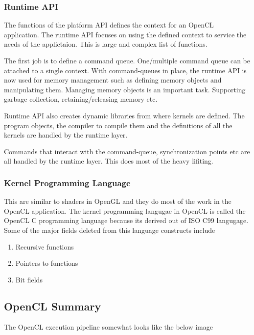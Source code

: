 \subsubsection{Runtime API}
The functions of the platform API defines the context for an OpenCL application. The runtime API focuses on using the defined context to service the needs of the applictaion. This is large and complex list of functions.

The first job is to define a command queue. One/multiple command queue can be attached to a single context. With command-queues in place, the runtime API is now used for memory management such as defining memory objects and manipulating them. Managing memory objects is an important task. Supporting garbage collection, retaining/releasing memory etc.

Runtime API also creates dynamic libraries from where kernels are defined. The program objects, the compiler to compile them and the definitions of all the kernels are handled by the runtime layer.

Commands that interact with the command-queue, synchronization points etc are all handled by the runtime layer. This does most of the heavy lifiting.

\subsubsection{Kernel Programming Language}
This are similar to shaders in OpenGL and they do most of the work in the OpenCL application. The kernel programming langugae in OpenCL is called the OpenCL C programming language because its derived out of ISO C99 langugage. Some of the major fields deleted from this language constructs include

\begin{enumerate}
	\item Recursive functions
	\item Pointers to functions
	\item Bit fields
\end{enumerate}

\subsection{OpenCL Summary}
The OpenCL execution pipeline somewhat looks like the below image

